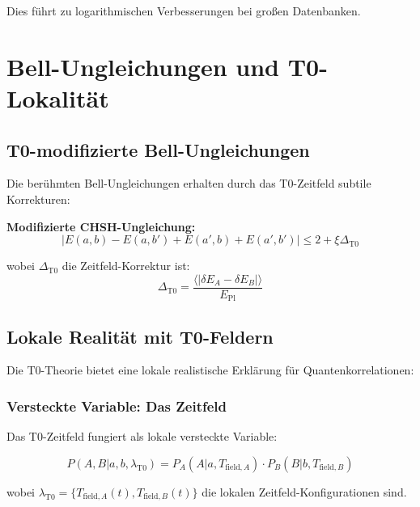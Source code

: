\documentclass[12pt,a4paper]{article}
\newcommand{\xipar}{\xi}
\newcommand{\deltaE}{\delta E}
\newcommand{\EPlanck}{E_{\text{Pl}}}
\begin{document}
	Dies führt zu logarithmischen Verbesserungen bei großen Datenbanken.
	
	\section{Bell-Ungleichungen und T0-Lokalität}
	
	\subsection{T0-modifizierte Bell-Ungleichungen}
	
	Die berühmten Bell-Ungleichungen erhalten durch das T0-Zeitfeld subtile Korrekturen:
	
	\begin{tcolorbox}[colback=red!5!white,colframe=red!75!black,title=T0-Bell-Korrekturen]
		\textbf{Modifizierte CHSH-Ungleichung:}
		\begin{equation}
			|E(a,b) - E(a,b') + E(a',b) + E(a',b')| \leq 2 + \xipar \Delta_{\text{T0}}
		\end{equation}
		
		wobei $\Delta_{\text{T0}}$ die Zeitfeld-Korrektur ist:
		\begin{equation}
			\Delta_{\text{T0}} = \frac{\langle|\deltaE_A - \deltaE_B|\rangle}{\EPlanck}
		\end{equation}
	\end{tcolorbox}
	
	\subsection{Lokale Realität mit T0-Feldern}
	
	Die T0-Theorie bietet eine lokale realistische Erklärung für Quantenkorrelationen:
	
	\subsubsection{Versteckte Variable: Das Zeitfeld}
	
	Das T0-Zeitfeld fungiert als lokale versteckte Variable:
	
	\begin{equation}
		P(A,B|a,b,\lambda_{\text{T0}}) = P_A(A|a,T_{\text{field},A}) \cdot P_B(B|b,T_{\text{field},B})
	\end{equation}
	
	wobei $\lambda_{\text{T0}} = \{T_{\text{field},A}(t), T_{\text{field},B}(t)\}$ die lokalen Zeitfeld-Konfigurationen sind.
	
\end{document}
